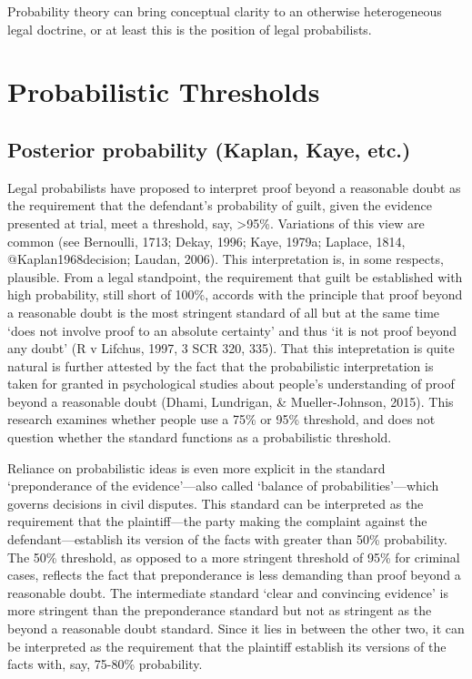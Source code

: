 \documentclass[10pt,dvipsnames]{scrartcl}
\begin{document}
Probability theory can bring conceptual clarity to an otherwise
heterogeneous legal doctrine, or at least this is the position of legal
probabilists.

\hypertarget{probabilistic-thresholds}{%
\section{Probabilistic Thresholds}\label{probabilistic-thresholds}}

\hypertarget{posterior-probability-kaplan-kaye-etc.}{%
\subsection{Posterior probability (Kaplan, Kaye,
etc.)}\label{posterior-probability-kaplan-kaye-etc.}}

Legal probabilists have proposed to interpret proof beyond a reasonable
doubt as the requirement that the defendant's probability of guilt,
given the evidence presented at trial, meet a threshold, say,
\textgreater{}95\%. Variations of this view are common (see Bernoulli,
1713; Dekay, 1996; Kaye, 1979a; Laplace, 1814, @Kaplan1968decision;
Laudan, 2006). This interpretation is, in some respects, plausible. From
a legal standpoint, the requirement that guilt be established with high
probability, still short of 100\%, accords with the principle that proof
beyond a reasonable doubt is the most stringent standard of all but at
the same time `does not involve proof to an absolute certainty' and thus
`it is not proof beyond any doubt' (R v Lifchus, 1997, 3 SCR 320, 335).
That this intepretation is quite natural is further attested by the fact
that the probabilistic interpretation is taken for granted in
psychological studies about people's understanding of proof beyond a
reasonable doubt (Dhami, Lundrigan, \& Mueller-Johnson, 2015). This
research examines whether people use a 75\% or 95\% threshold, and does
not question whether the standard functions as a probabilistic
threshold.

Reliance on probabilistic ideas is even more explicit in the standard
`preponderance of the evidence'---also called `balance of
probabilities'---which governs decisions in civil disputes. This
standard can be interpreted as the requirement that the plaintiff---the
party making the complaint against the defendant---establish its version
of the facts with greater than 50\% probability. The 50\% threshold, as
opposed to a more stringent threshold of 95\% for criminal cases,
reflects the fact that preponderance is less demanding than proof beyond
a reasonable doubt. The intermediate standard `clear and convincing
evidence' is more stringent than the preponderance standard but not as
stringent as the beyond a reasonable doubt standard. Since it lies in
between the other two, it can be interpreted as the requirement that the
plaintiff establish its versions of the facts with, say, 75-80\%
probability.
\end{document}
